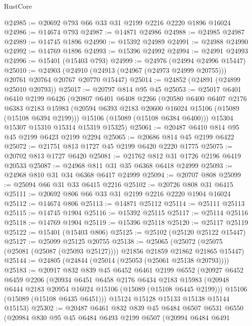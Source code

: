 \begin{lexlean}{RustCore}
\begin{coremodule}
@24985 := @20692 @793 @66 @33 @31 @2199 @2216 @2220 @1896 @16024
@24986 := @14674 @793
@24987 := @14871 @24986
@24988 := @24985 @24987
@24989 := @14745 @1896
@24990 := @15392 @24989
@24991 := @24988 @24990
@24992 := @14769 @1896
@24993 := @15396 @24992
@24994 := @24991 @24993
@24996 := @15401 (@15403 @793)
@24999 := @24976 (@24994 @24996 @15447)
@25010 := @24903
    (@24910 (@24913 (@24967 (@24973 @24999 @20755))) @20761 @20764 @20767 @20770 @15447)
@25014 := @24852 (@24891 (@24899 @25010 @20793))
@25017 := @20797 @814 @95 @45
@25053 := @25017
    @6401
    @6410
    @2199
    @6426
    (@20807
      @6401
      @6408
      @2266
      (@20580
        @6400
        @6407
        @2176
        @6383
        @2183
        @15983
        (@20594 @6393 @2183 @20600 @16024 @15106 (@15089 (@15108 @6394 @2199)))
        @15106
        (@15089 (@15108 @6384 @6400)))
      @15304
      @15307
      @15310
      @15314
      @15319
      @15325)
@25061 := @20487 @6410 @814 @95 @45 @2199 @6423 @2199 @2294
@25065 := @20686 @814 @45 @2199 @6422
@25072 := @21751 @813 @1727 @45 @2199 @6420 @2220 @1775
@25075 := @20702 @813 @1727 @6420
@25081 := @21762 @812 @31 @1726 @2196 @6419 @20533
@25087 := @24968 @811 @31 @35 @6368 @6418 @24999
@25093 := @24968 @810 @31 @34 @6368 @6417 @24999
@25094 := @20707 @808
@25099 := @25094 @66 @31 @33 @6415 @2216
@25102 := @20726 @808 @31 @6415
@25111 := @20692 @806 @66 @33 @31 @2199 @2216 @2220 @1904 @16024
@25112 := @14674 @806
@25113 := @14871 @25112
@25114 := @25111 @25113
@25115 := @14745 @1904
@25116 := @15392 @25115
@25117 := @25114 @25116
@25118 := @14769 @1904
@25119 := @15396 @25118
@25120 := @25117 @25119
@25122 := @15401 (@15403 @806)
@25125 := @25102 (@25120 @25122 @15447)
@25127 := @25099 @25125 @20755
@25138 := @25065
    (@25072 (@25075 (@25081 (@25087 (@25093 @25127)))) @21856 @21859 @21862 @21865 @15447)
@25144 := @24805 (@24844 (@25014 (@25053 (@25061 @25138 @20793))))
@25183 := @20917
    @832
    @839
    @45
    @6452
    @6461
    @2199
    @6552
    (@20927
      @6452
      @6459
      @2206
      (@20934
        @6451
        @6458
        @2176
        @6434
        @2183
        @15983
        (@20948 @6444 @2183 @20954 @16024 @15106 (@15089 (@15108 @6445 @2199)))
        @15106
        (@15089 (@15108 @6435 @6451)))
      @15124
      @15128
      @15133
      @15138
      @15144
      @15153)
@25302 := @20487
    @6461
    @832
    @839
    @45
    @6484
    @6507
    @6531
    @6550
    (@20984
      @830
      @95
      @45
      @6484
      @6493
      @2199
      @6507
      (@20994
        @6484
        @6491

\end{coremodule}
\end{lexlean}

